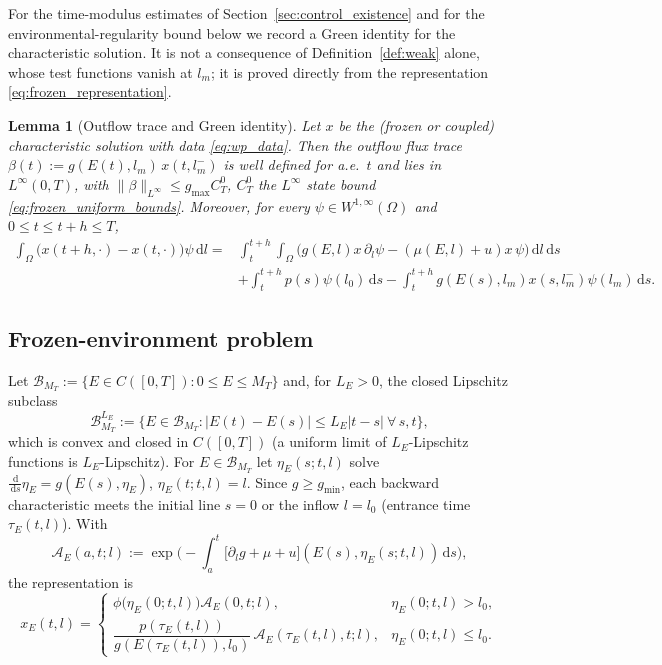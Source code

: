 \documentclass[pdflatex,sn-mathphys-num]{sn-jnl}
\newcommand{\Om}{\Omega}
\newcommand{\dd}{\,\mathrm{d}}
\theoremstyle{plain}
\newtheorem{lemma}[theorem]{Lemma}
\theoremstyle{definition}
\theoremstyle{remark}
\begin{document}
For the time-modulus estimates of Section~\ref{sec:control_existence} and for the
environmental-regularity bound below we record a Green identity for the
characteristic solution. It is not a consequence of
Definition~\ref{def:weak} alone, whose test functions vanish at $l_m$; it is
proved directly from the representation \eqref{eq:frozen_representation}.

\begin{lemma}[Outflow trace and Green identity]
\label{lem:green_trace}
Let $x$ be the (frozen or coupled) characteristic solution with data
\eqref{eq:wp_data}. Then the outflow flux trace
$\beta(t):=g(E(t),l_m)\,x(t,l_m^-)$ is well defined for a.e.\ $t$ and lies in
$L^\infty(0,T)$, with $\|\beta\|_{L^\infty}\le g_{\max}C_T^0$, $C_T^0$ the
$L^\infty$ state bound \eqref{eq:frozen_uniform_bounds}. Moreover, for every
$\psi\in W^{1,\infty}(\Om)$ and $0\le t\le t+h\le T$,
\begin{equation}\label{eq:green_time_identity}
\begin{aligned}
\int_\Om\big(x(t+h,\cdot)-x(t,\cdot)\big)\psi\dd l
={}&\int_t^{t+h}\!\!\int_\Om\Big(g(E,l)x\,\partial_l\psi-(\mu(E,l)+u)x\,\psi\Big)\dd l\dd s\\
&+\int_t^{t+h}p(s)\psi(l_0)\dd s
-\int_t^{t+h}g(E(s),l_m)x(s,l_m^-)\psi(l_m)\dd s.
\end{aligned}
\end{equation}
\end{lemma}

\subsection{Frozen-environment problem}
\label{subsec:frozen_environment}

Let $\mathcal B_{M_T}:=\{E\in C([0,T]):0\le E\le M_T\}$ and, for $L_E>0$, the
closed Lipschitz subclass
\[
\mathcal B_{M_T}^{L_E}
:=\big\{E\in\mathcal B_{M_T}:|E(t)-E(s)|\le L_E|t-s|\ \forall\, s,t\big\},
\]
which is convex and closed in $C([0,T])$ (a uniform limit of $L_E$-Lipschitz
functions is $L_E$-Lipschitz). For $E\in\mathcal B_{M_T}$ let
$\eta_E(s;t,l)$ solve
$\frac{\dd}{\dd s}\eta_E=g(E(s),\eta_E)$, $\eta_E(t;t,l)=l$. Since $g\ge g_{\min}$,
each backward characteristic meets the initial line $s=0$ or the inflow $l=l_0$
(entrance time $\tau_E(t,l)$). With
\[
\mathcal A_E(a,t;l)
:=
\exp\!\Big(
-\!\int_a^t\!\big[\partial_lg+\mu+u\big](E(s),\eta_E(s;t,l))\dd s
\Big),
\]
the representation is
\begin{equation}\label{eq:frozen_representation}
x_E(t,l)
=
\begin{cases}
\phi\big(\eta_E(0;t,l)\big)\mathcal A_E(0,t;l),
& \eta_E(0;t,l)>l_0,\\[2mm]
\dfrac{p(\tau_E(t,l))}{g(E(\tau_E(t,l)),l_0)}\,\mathcal A_E(\tau_E(t,l),t;l),
& \eta_E(0;t,l)\le l_0.
\end{cases}
\end{equation}
\end{document}
